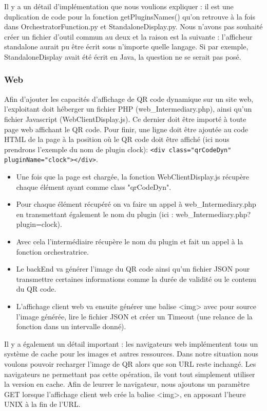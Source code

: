 \documentclass[a4paper,12pt]{article}
\begin{document}
\noindent Il y a un détail d'implémentation que nous voulions expliquer : il est une duplication de code pour la fonction getPluginsNames() qu'on retrouve à la fois dans OrchestratorFunction.py et StandaloneDisplay.py. Nous n'avons pas souhaité créer un fichier d'outil commun au deux et la raison est la suivante : l'afficheur standalone aurait pu être écrit sous n'importe quelle langage. Si par exemple, StandaloneDisplay avait été écrit en Java, la question ne se serait pas posé.

\subsubsection{Web}
\noindent Afin d'ajouter les capacités d'affichage de QR code dynamique sur un site web, l'exploitant doit héberger un fichier PHP (web\_Intermediary.php), ainsi qu'un fichier Javascript (WebClientDisplay.js). Ce dernier doit être importé à toute page web affichant le QR code. Pour finir, une ligne doit être ajoutée au code HTML de la page à la position où le QR code doit être affiché (ici nous prendrons l'exemple du nom de plugin clock): 
\verb|<div class="qrCodeDyn" pluginName="clock"></div>|.\\
\noindent
\begin{itemize}
\item Une fois que la page est chargée, la fonction WebClientDisplay.js récupère chaque élément ayant comme class "qrCodeDyn".
\item Pour chaque élément récupéré on va faire un appel à web\_Intermediary.php en transmettant également le nom du plugin (ici : web\_Intermediary.php?plugin=clock).
\item Avec cela l'intermédiaire récupère le nom du plugin et fait un appel à la fonction orchestratrice.
\item Le backEnd va générer l'image du QR code ainsi qu'un fichier JSON pour transmettre certaines informations comme la durée de validité ou le contenu du QR code.
\item L'affichage client web va ensuite générer une balise <img> avec pour source l'image générée, lire le fichier JSON et créer un Timeout (une relance de la fonction dans un intervalle donné).\\
\end{itemize}

\noindent Il y a également un détail important : les navigateurs web implémentent tous un système de cache pour les images et autres ressources. Dans notre situation nous voulons pouvoir recharger l'image de QR alors que son URL reste inchangé. Les navigateurs ne permettant pas cette opération, ils vont tout simplement utiliser la version en cache. Afin de leurrer le navigateur, nous ajoutons un paramètre GET lorsque l'affichage client web crée la balise <img>, en apposant l'heure UNIX à la fin de l'URL.
\end{document}
